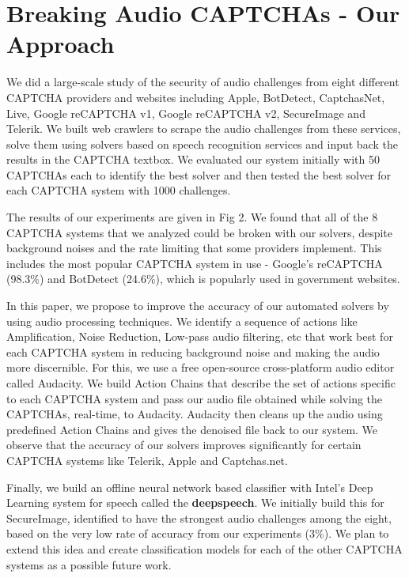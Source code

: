 \section{Breaking Audio CAPTCHAs - Our Approach}
\label{sec:ourapproach}

We did a large-scale study of the security of audio challenges from eight different CAPTCHA providers and websites including Apple, BotDetect, CaptchasNet, Live, Google reCAPTCHA v1, Google reCAPTCHA v2, SecureImage and Telerik. We built web crawlers to scrape the audio challenges from these services, solve them using solvers based on speech recognition services and input back the results in the CAPTCHA textbox. We evaluated our system initially with 50 CAPTCHAs each to identify the best solver and then tested the best solver for each CAPTCHA system with 1000 challenges.\newline

The results of our experiments are given in Fig 2. We found that all of the 8 CAPTCHA systems that we analyzed could be broken with our solvers, despite background noises and the rate limiting that some providers implement. This includes the most popular CAPTCHA system in use - Google's reCAPTCHA (98.3\%) and BotDetect (24.6\%), which is popularly used in government websites. \newline

In this paper, we propose to improve the accuracy of our automated solvers by using audio processing techniques. We identify a sequence of actions like Amplification, Noise Reduction, Low-pass audio filtering, etc that work best for each CAPTCHA system in reducing background noise and making the audio more discernible. For this, we use a free open-source cross-platform audio editor called Audacity. We build Action Chains that describe the set of actions specific to each CAPTCHA system and pass our audio file obtained while solving the CAPTCHAs, real-time, to Audacity. Audacity then cleans up the audio using predefined Action Chains and gives the denoised file back to our system. We observe that the accuracy of our solvers improves significantly for certain CAPTCHA systems like Telerik, Apple and Captchas.net.\newline

Finally, we build an offline neural network based classifier with Intel's Deep Learning system for speech called the \textbf{deepspeech}. We initially build this for SecureImage, identified to have the strongest audio challenges among the eight, based on the very low rate of accuracy from our experiments (3\%). We plan to extend this idea and create classification models for each of the other CAPTCHA systems as a possible future work.\newline

